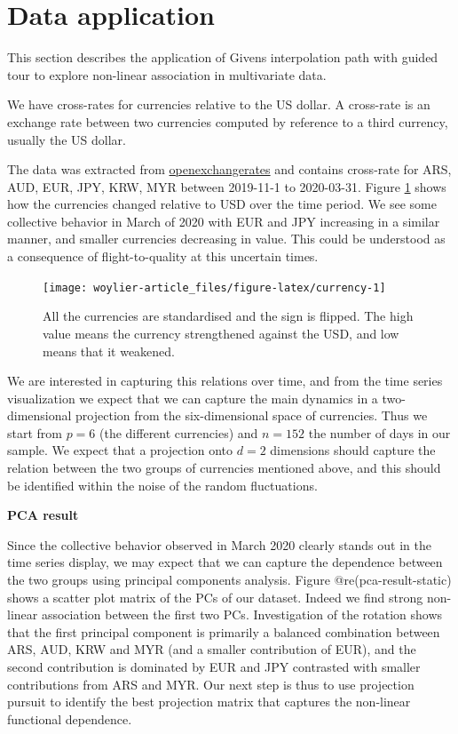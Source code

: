 \hypertarget{data-application}{%
\section{Data application}\label{data-application}}

This section describes the application of Givens interpolation path with guided tour to explore non-linear association in multivariate data.

We have cross-rates for currencies relative to the US dollar. A cross-rate is an exchange rate between two currencies computed by reference to a third currency, usually the US dollar.

The data was extracted from \href{https://openexchangerates.org}{openexchangerates} and contains cross-rate for ARS, AUD, EUR, JPY, KRW, MYR between 2019-11-1 to 2020-03-31. Figure \ref{fig:currency} shows how the currencies changed relative to USD over the time period. We see some collective behavior in March of 2020 with EUR and JPY increasing in a similar manner, and smaller currencies decreasing in value. This could be understood as a consequence of flight-to-quality at this uncertain times.

\begin{figure}
\texttt{[image: woylier-article\_files/figure-latex/currency-1]} \caption{All the currencies are standardised and the sign is flipped. The high value means the currency strengthened against the USD, and low means that it weakened.}\label{fig:currency}
\end{figure}

We are interested in capturing this relations over time, and from the time series visualization we expect that we can capture the main dynamics in a two-dimensional projection from the six-dimensional space of currencies. Thus we start from \(p=6\) (the different currencies) and \(n=152\) the number of days in our sample. We expect that a projection onto \(d=2\) dimensions should capture the relation between the two groups of currencies mentioned above, and this should be identified within the noise of the random fluctuations.

\textbf{PCA result}

Since the collective behavior observed in March 2020 clearly stands out in the time series display, we may expect that we can capture the dependence between the two groups using principal components analysis. Figure @re(pca-result-static)
shows a scatter plot matrix of the PCs of our dataset. Indeed we find strong non-linear association between the first two PCs. Investigation of the rotation shows that the first principal component is primarily a balanced combination between ARS, AUD, KRW and MYR (and a smaller contribution of EUR), and the second contribution is dominated by EUR and JPY contrasted with smaller contributions from ARS and MYR. Our next step is thus to use projection pursuit to identify the best projection matrix that captures the non-linear functional dependence.

